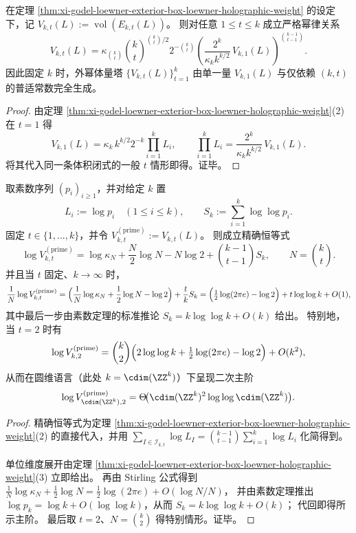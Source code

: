 \begin{proposition}\label{prop:xi-godel-loewner-volume-renormalization-power-law}
在定理 \ref{thm:xi-godel-loewner-exterior-box-loewner-holographic-weight} 的设定下，记 \(V_{k,t}(L):=\operatorname{vol}(E_{k,t}(L))\)。
则对任意 \(1\le t\le k\) 成立严格幂律关系
\[
V_{k,t}(L)
=
\kappa_{\binom{k}{t}}\binom{k}{t}^{\binom{k}{t}/2}2^{-\binom{k}{t}}
\left(\frac{2^{k}}{\kappa_{k}k^{k/2}}\,V_{k,1}(L)\right)^{\binom{k-1}{t-1}}.
\]
因此固定 \(k\) 时，外幂体量塔 \(\{V_{k,t}(L)\}_{t=1}^{k}\) 由单一量 \(V_{k,1}(L)\) 与仅依赖 \((k,t)\) 的普适常数完全生成。
\end{proposition}
\begin{proof}
由定理 \ref{thm:xi-godel-loewner-exterior-box-loewner-holographic-weight}(2) 在 \(t=1\) 得
\[
V_{k,1}(L)=\kappa_k\,k^{k/2}2^{-k}\prod_{i=1}^{k}L_i,
\qquad
\prod_{i=1}^{k}L_i=\frac{2^{k}}{\kappa_k k^{k/2}}\,V_{k,1}(L).
\]
将其代入同一条体积闭式的一般 \(t\) 情形即得。证毕。
\end{proof}

\begin{theorem}\label{thm:xi-godel-prime-register-exterior-volume-quadratic-law}
取素数序列 \((p_i)_{i\ge 1}\)，并对给定 \(k\) 置
\[
L_i:=\log p_i\quad(1\le i\le k),
\qquad
S_k:=\sum_{i=1}^{k}\log\log p_i.
\]
固定 \(t\in\{1,\dots,k\}\)，并令 \(V^{(\mathrm{prime})}_{k,t}:=V_{k,t}(L)\)。
则成立精确恒等式
\[
\log V^{(\mathrm{prime})}_{k,t}
=
\log\kappa_N+\frac{N}{2}\log N-N\log 2+\binom{k-1}{t-1}S_k,
\qquad N=\binom{k}{t}.
\]
并且当 \(t\) 固定、\(k\to\infty\) 时，
\[
\frac{1}{N}\log V^{(\mathrm{prime})}_{k,t}
=
\Bigl(\frac{1}{N}\log\kappa_N+\frac12\log N-\log 2\Bigr)+\frac{t}{k}S_k
=
\Bigl(\tfrac12\log(2\pi e)-\log 2\Bigr)+t\log\log k+O(1),
\]
其中最后一步由素数定理的标准推论 \(S_k=k\log\log k+O(k)\) 给出。
特别地，当 \(t=2\) 时有
\[
\log V^{(\mathrm{prime})}_{k,2}
=
\binom{k}{2}\Bigl(2\log\log k+\tfrac12\log(2\pi e)-\log 2\Bigr)+O(k^2),
\]
从而在圆维语言（此处 \(k=\cdim(\ZZ^k)\)）下呈现二次主阶
\[
\log V^{(\mathrm{prime})}_{\cdim(\ZZ^k),2}
=
\Theta\!\big(\cdim(\ZZ^k)^2\log\log \cdim(\ZZ^k)\big).
\]
\end{theorem}
\begin{proof}
精确恒等式为定理 \ref{thm:xi-godel-loewner-exterior-box-loewner-holographic-weight}(2) 的直接代入，并用
\(
\sum_{I\in\mathcal I_{k,t}}\log L_I=\binom{k-1}{t-1}\sum_{i=1}^k\log L_i
\)
化简得到。
\par
单位维度展开由定理 \ref{thm:xi-godel-loewner-exterior-box-loewner-holographic-weight}(3) 立即给出。
再由 Stirling 公式得到
\(
\frac1N\log\kappa_N+\frac12\log N=\frac12\log(2\pi e)+O(\log N/N)
\)，
并由素数定理推出 \(\log p_k=\log k+O(\log\log k)\)，从而
\(
S_k=k\log\log k+O(k)
\)；
代回即得所示主阶。
最后取 \(t=2\)、\(N=\binom{k}{2}\) 得特别情形。证毕。
\end{proof}

\endinput
